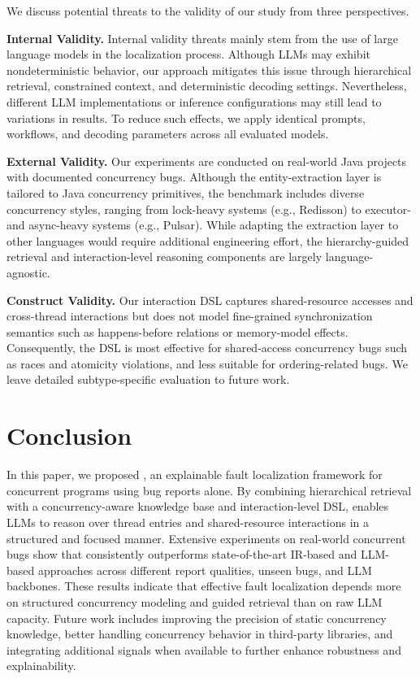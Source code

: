 We discuss potential threats to the validity of our study from three perspectives.

\textbf{Internal Validity.}
Internal validity threats mainly stem from the use of large language models in the localization process.
Although LLMs may exhibit nondeterministic behavior, our approach mitigates this issue through hierarchical retrieval, constrained context, and deterministic decoding settings.
Nevertheless, different LLM implementations or inference configurations may still lead to variations in results.
To reduce such effects, we apply identical prompts, workflows, and decoding parameters across all evaluated models.

\textbf{External Validity.}
Our experiments are conducted on real-world Java projects with documented concurrency bugs. Although the entity-extraction layer is tailored to Java concurrency primitives, the benchmark includes diverse concurrency styles, ranging from lock-heavy systems (e.g., Redisson) to executor- and async-heavy systems (e.g., Pulsar). While adapting the extraction layer to other languages would require additional engineering effort, the hierarchy-guided retrieval and interaction-level reasoning components are largely language-agnostic.

\textbf{Construct Validity.}
Our interaction DSL captures shared-resource accesses and cross-thread interactions but does not model fine-grained synchronization semantics such as happens-before relations or memory-model effects. Consequently, the DSL is most effective for shared-access concurrency bugs such as races and atomicity violations, and less suitable for ordering-related bugs. We leave detailed subtype-specific evaluation to future work.

\section{Conclusion}

In this paper, we proposed \Name{}, an explainable fault localization framework for concurrent programs using bug reports alone.
By combining hierarchical retrieval with a concurrency-aware knowledge base and interaction-level DSL, \Name{} enables LLMs to reason over thread entries and shared-resource interactions in a structured and focused manner.
Extensive experiments on real-world concurrent bugs show that \Name{} consistently outperforms state-of-the-art IR-based and LLM-based approaches across different report qualities, unseen bugs, and LLM backbones.
These results indicate that effective fault localization depends more on structured concurrency modeling and guided retrieval than on raw LLM capacity.
Future work includes improving the precision of static concurrency knowledge, better handling concurrency behavior in third-party libraries, and integrating additional signals when available to further enhance robustness and explainability.
